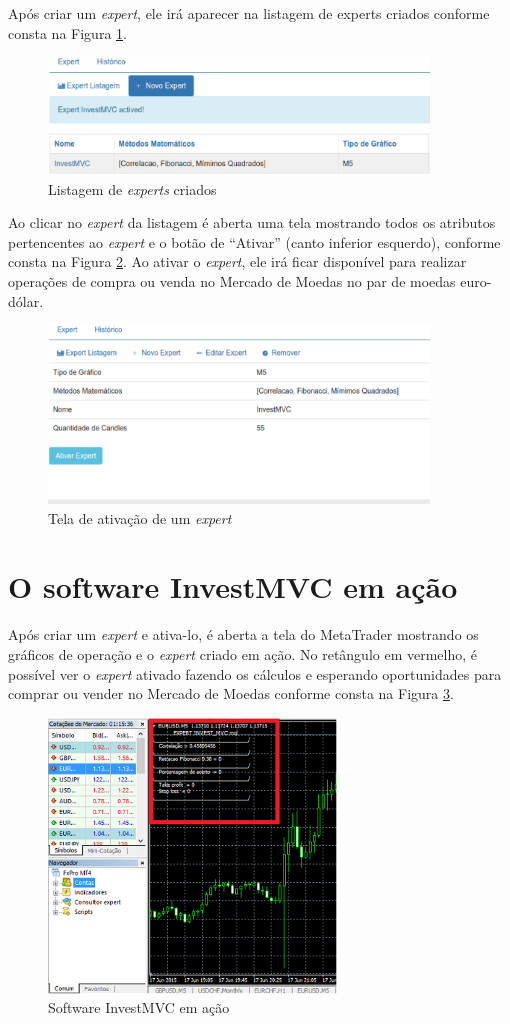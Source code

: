 Após criar um \textit{expert}, ele irá aparecer na listagem de experts criados conforme consta na Figura \ref{ativado}.

\begin{figure}[H]
\centering
\includegraphics[width=0.9\textwidth]{figuras/ativado}
\caption{Listagem de \textit{experts} criados}
\label{ativado}
\end{figure}

Ao clicar no \textit{expert} da listagem é aberta uma tela mostrando todos os atributos pertencentes ao \textit{expert} e o botão de “Ativar” (canto inferior esquerdo), conforme consta na Figura \ref{ativar}. Ao ativar o \textit{expert}, ele irá ficar disponível para realizar operações de compra ou venda no Mercado de Moedas no par de moedas euro-dólar.

\begin{figure}[H]
\centering
\includegraphics[width=0.9\textwidth]{figuras/ativar}
\caption{Tela de ativação de um \textit{expert}}
\label{ativar}
\end{figure}

\section{O software InvestMVC em ação}
Após criar um \textit{expert} e ativa-lo, é aberta a tela do MetaTrader mostrando os gráficos de operação e o \textit{expert} criado em ação. No retângulo em vermelho, é possível ver o \textit{expert} ativado fazendo os cálculos e esperando oportunidades para comprar ou vender no Mercado de Moedas conforme consta na Figura \ref{wine}.

\begin{figure}[H]
\centering
\includegraphics[width=0.7\textwidth]{figuras/wine}
\caption{Software InvestMVC em ação}
\label{wine}
\end{figure}
